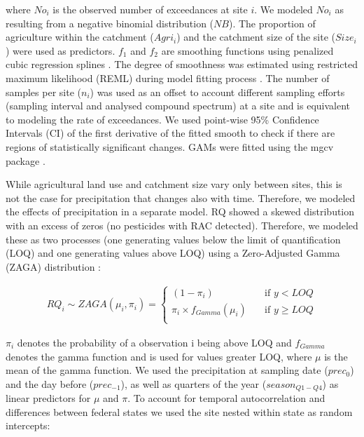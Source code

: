 \documentclass[journal=esthag,manuscript=article]{achemso}
\begin{document}
where $No_i$ is the observed number of exceedances at site $i$. 
We modeled $No_i$ as resulting from a negative binomial distribution ($NB$).
The proportion of agriculture within the catchment ($Agri_i$) and the catchment size of the site ($Size_i$) were used as predictors. 
$f_1$ and $f_2$ are smoothing functions using penalized cubic regression splines \citep{wood_generalized_2006}.
The degree of smoothness was estimated using restricted maximum likelihood (REML) during model fitting process \citep{wood_fast_2011}.
The number of samples per site ($n_i$) was used as an offset to account different sampling efforts (sampling interval and analysed compound spectrum) at a site and is equivalent to modeling the rate of exceedances. 
We used point-wise 95\% Confidence Intervals (CI) of the first derivative of the fitted smooth to check if there are regions of statistically significant changes.
GAMs were fitted using the mgcv package \citep{wood_fast_2011}.


While agricultural land use and catchment size vary only between sites, this is not the case for precipitation that changes also with time.
Therefore, we modeled the effects of precipitation in a separate model.
RQ showed a skewed distribution with an excess of zeros (no pesticides with RAC detected). 
Therefore, we modeled these as two processes (one generating values below the limit of quantification (LOQ) and one generating values above LOQ) using a Zero-Adjusted Gamma (ZAGA) distribution \cite{rigby_generalized_2005,stasinopoulos_gamlss.dist:_2016}:

\begin{align}
RQ_i \sim ZAGA(\mu_i, \pi_i) = 
  \begin{cases}
    (1 - \pi_i)   & \quad  \text{if } y < LOQ \\
    \pi_i \times f_{Gamma} (\mu_i) & \quad \text{if } y \ge LOQ \\
  \end{cases}
  \label{eqn:eqn3}
\end{align}

$\pi_i$ denotes the probability of a observation i being above LOQ and $f_{Gamma}$ denotes the gamma function and is used for values greater LOQ, where $\mu$ is the mean of the gamma function.
We used the precipitation at sampling date ($prec_0$) and the day before ($prec_{-1}$), as well as quarters of the year ($season_{Q1-Q4}$) as linear predictors for $\mu$ and $\pi$.
To account for temporal autocorrelation and differences between federal states we used the site nested within state as random intercepts:
\end{document}
